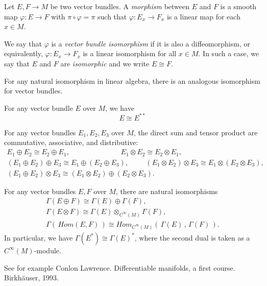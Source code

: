 \documentclass{ximera}
\begin{document}
\begin{definition}
    Let $E,F \to M$ be two vector bundles. A \emph{morphism} between $E$ and $F$ is a smooth map $\varphi : E \to F $ with $\pi \circ \varphi  = \pi $  such that $\varphi : E_x \to F_x$ is a linear map for each $x \in M$.     
    
    We say that $\varphi$ is a \emph{vector bundle isomorphism} if it is also a diffeomorphism, or equivalently, $\varphi : E_x \to F_x$ is a linear isomorphism for all $x \in M$. In such a case, we say that $E$ and $F$ are \emph{isomorphic} and we write $E \cong F$.
\end{definition}

\begin{theorem}
     For any natural isomorphism in linear algebra, there is an analogous isomorphism for vector bundles. 
\end{theorem}


\begin{example}
     For any vector bundle $E$ over $M$, we have
    \[    E  \cong E^{\ast \ast }    \]
\end{example}

\begin{example}
    For any vector bundles $E_1, E_2, E_3  $ over $M$, the direct sum and tensor product are commutative, associative, and distributive:
    \begin{gather*}
    E_1 \oplus E_2 \cong E_2 \oplus E_1 , \hspace{3cm} E_1 \otimes E_2 \cong E_2 \otimes E_1 , \\
       ( E_1 \oplus E_2) \oplus E_3 \cong E_1 \oplus (E_2 \oplus E_3) , \hspace{1cm} ( E_1 \otimes E_2) \otimes E_3 \cong E_1 \otimes (E_2 \otimes E_3) ,  \\
       ( E_1 \oplus E_2) \otimes E_3 \cong ( E_1 \otimes E_2 ) \oplus (E_2 \otimes E_3) .
    \end{gather*}
\end{example}



\begin{theorem}
For any vector bundles $E, F $ over $M$, there are natural isomorphisms
\begin{gather*}
     \Gamma (E \oplus F) \cong \Gamma (E) \oplus \Gamma (F)  ,  \\
      \Gamma (E \otimes F) \cong \Gamma (E) \otimes _{C^{\infty}(M)} \Gamma (F)  , \\
       \Gamma ( \, Hom ( E, F) \, ) \cong  Hom_{C^{\infty}(M)}( \, \Gamma (E) \, , \,  \Gamma (F) \, ) .
       \end{gather*}
In particular, we have  $    \Gamma (E^{\ast}) \cong    \Gamma (E) ^{\ast}  $, where the second dual is taken as a $C^{\infty}(M)$-module.
\end{theorem}

\begin{solution}
    See for example Conlon Lawrence. Differentiable manifolds, a first course. Birkh\"auser, 1993.
\end{solution}
\end{document}
